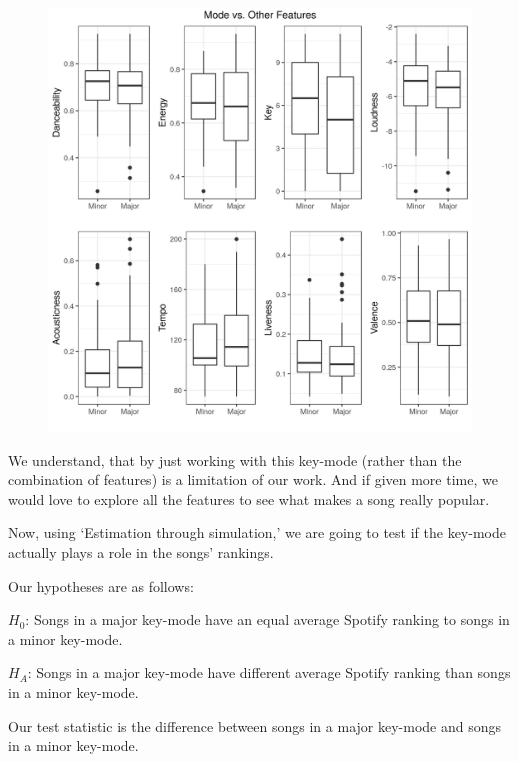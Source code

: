 \documentclass[]{article}
\begin{document}
\begin{figure}[H]
\includegraphics[width=0.8\linewidth]{../results/figure/Fig02_Explore_Mode_and_Features} \caption{ }\label{fig:unnamed-chunk-3}
\end{figure}

We understand, that by just working with this key-mode (rather than the
combination of features) is a limitation of our work. And if given more
time, we would love to explore all the features to see what makes a song
really popular.

Now, using `Estimation through simulation,' we are going to test if the
key-mode actually plays a role in the songs' rankings.

Our hypotheses are as follows:

\textbf{$H_{0}$}: Songs in a major key-mode have an equal average
Spotify ranking to songs in a minor key-mode.

\textbf{$H_{A}$}: Songs in a major key-mode have different average
Spotify ranking than songs in a minor key-mode.

Our test statistic is the difference between songs in a major key-mode
and songs in a minor key-mode.
\end{document}
